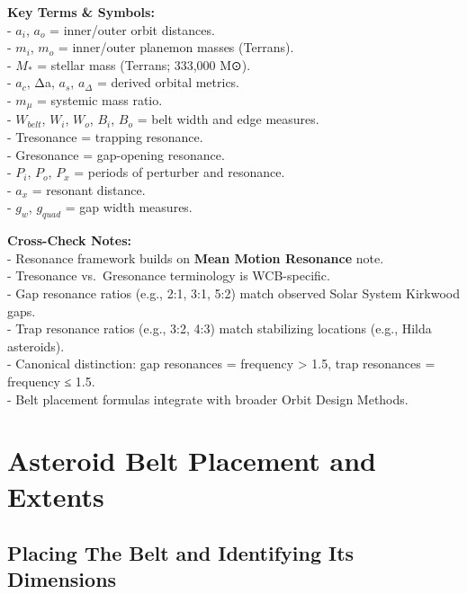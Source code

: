 \documentclass[
  letterpaper,
]{book}
\begin{document}
\textbf{Key Terms \& Symbols:}\\
- \(a_i\), \(a_o\) = inner/outer orbit distances.\\
- \(m_i\), \(m_o\) = inner/outer planemon masses (Terrans).\\
- \(M_*\) = stellar mass (Terrans; 333,000 M⊙).\\
- \(a_c\), Δa, \(a_s\), \(a_\Delta\) = derived orbital metrics.\\
- \(m_\mu\) = systemic mass ratio.\\
- \(W_{belt}\), \(W_i\), \(W_o\), \(B_i\), \(B_o\) = belt width and edge
measures.\\
- Tresonance = trapping resonance.\\
- Gresonance = gap-opening resonance.\\
- \(P_i\), \(P_o\), \(P_x\) = periods of perturber and resonance.\\
- \(a_x\) = resonant distance.\\
- \(g_w\), \(g_{quad}\) = gap width measures.

\textbf{Cross-Check Notes:}\\
- Resonance framework builds on \textbf{Mean Motion Resonance} note.\\
- Tresonance vs.~Gresonance terminology is WCB-specific.\\
- Gap resonance ratios (e.g., 2:1, 3:1, 5:2) match observed Solar System
Kirkwood gaps.\\
- Trap resonance ratios (e.g., 3:2, 4:3) match stabilizing locations
(e.g., Hilda asteroids).\\
- Canonical distinction: gap resonances = frequency \textgreater{} 1.5,
trap resonances = frequency ≤ 1.5.\\
- Belt placement formulas integrate with broader Orbit Design Methods.

\chapter{Asteroid Belt Placement and
Extents}\label{asteroid-belt-placement-and-extents}

\section{Placing The Belt and Identifying Its
Dimensions}\label{placing-the-belt-and-identifying-its-dimensions}
\end{document}
